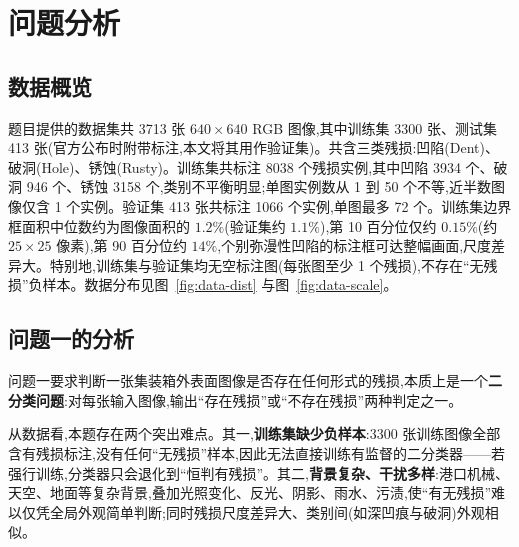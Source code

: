 \section{问题分析}

\subsection{数据概览}

题目提供的数据集共 3713 张 $640\times640$ RGB 图像,其中训练集 3300 张、测试集 413 张(官方公布时附带标注,本文将其用作验证集)。共含三类残损:凹陷(Dent)、破洞(Hole)、锈蚀(Rusty)。训练集共标注 8038 个残损实例,其中凹陷 3934 个、破洞 946 个、锈蚀 3158 个,类别不平衡明显;单图实例数从 1 到 50 个不等,近半数图像仅含 1 个实例。验证集 413 张共标注 1066 个实例,单图最多 72 个。训练集边界框面积中位数约为图像面积的 $1.2\%$(验证集约 $1.1\%$),第 10 百分位仅约 $0.15\%$(约 $25\times25$ 像素),第 90 百分位约 $14\%$,个别弥漫性凹陷的标注框可达整幅画面,尺度差异大。特别地,训练集与验证集均无空标注图(每张图至少 1 个残损),不存在“无残损”负样本。数据分布见图~\ref{fig:data-dist} 与图~\ref{fig:data-scale}。

%

\subsection{问题一的分析}

问题一要求判断一张集装箱外表面图像是否存在任何形式的残损,本质上是一个\textbf{二分类问题}:对每张输入图像,输出“存在残损”或“不存在残损”两种判定之一。

从数据看,本题存在两个突出难点。其一,\textbf{训练集缺少负样本}:3300 张训练图像全部含有残损标注,没有任何“无残损”样本,因此无法直接训练有监督的二分类器——若强行训练,分类器只会退化到“恒判有残损”。其二,\textbf{背景复杂、干扰多样}:港口机械、天空、地面等复杂背景,叠加光照变化、反光、阴影、雨水、污渍,使“有无残损”难以仅凭全局外观简单判断;同时残损尺度差异大、类别间(如深凹痕与破洞)外观相似。

